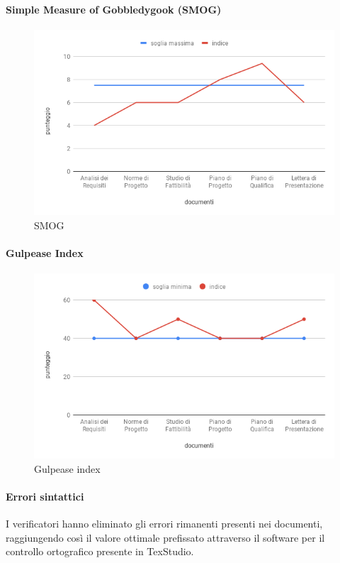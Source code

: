 \paragraph{Simple Measure of Gobbledygook (SMOG)}
\hspace{15cm}
\begin{figure}[h!]
	\centering
	\includegraphics[scale=0.5]{Smog.png}
	\caption{SMOG}
\end{figure}
\clearpage
\paragraph{Gulpease Index}
\hspace{15cm}
\begin{figure}[h!]
	\centering
	\includegraphics[scale=0.5]{GulpeaseIndex.png}
	\caption{Gulpease index}
\end{figure}

\paragraph{Errori sintattici}
\hspace{15cm}
 I verificatori hanno eliminato gli errori rimanenti presenti nei documenti, raggiungendo così il valore ottimale prefissato attraverso il software per il controllo ortografico presente in TexStudio. 
